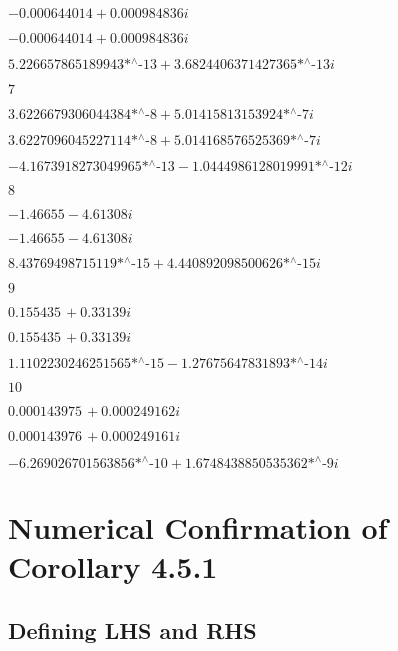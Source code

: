 \noindent\(-0.000644014+0.000984836 i\)

\noindent\(-0.000644014+0.000984836 i\)

\noindent\(\text{5.226657865189943$\grave{ }$*${}^{\wedge}$-13}+\text{3.6824406371427365$\grave{ }$*${}^{\wedge}$-13} i\)

\noindent\(7\)

\noindent\(\text{3.6226679306044384$\grave{ }$*${}^{\wedge}$-8}+\text{5.01415813153924$\grave{ }$*${}^{\wedge}$-7} i\)

\noindent\(\text{3.6227096045227114$\grave{ }$*${}^{\wedge}$-8}+\text{5.014168576525369$\grave{ }$*${}^{\wedge}$-7} i\)

\noindent\(-\text{4.1673918273049965$\grave{ }$*${}^{\wedge}$-13}-\text{1.0444986128019991$\grave{ }$*${}^{\wedge}$-12} i\)

\noindent\(8\)

\noindent\(-1.46655-4.61308 i\)

\noindent\(-1.46655-4.61308 i\)

\noindent\(\text{8.43769498715119$\grave{ }$*${}^{\wedge}$-15}+\text{4.440892098500626$\grave{ }$*${}^{\wedge}$-15} i\)

\noindent\(9\)

\noindent\(0.155435\, +0.33139 i\)

\noindent\(0.155435\, +0.33139 i\)

\noindent\(\text{1.1102230246251565$\grave{ }$*${}^{\wedge}$-15}-\text{1.27675647831893$\grave{ }$*${}^{\wedge}$-14} i\)

\noindent\(10\)

\noindent\(0.000143975\, +0.000249162 i\)

\noindent\(0.000143976\, +0.000249161 i\)

\noindent\(-\text{6.269026701563856$\grave{ }$*${}^{\wedge}$-10}+\text{1.6748438850535362$\grave{ }$*${}^{\wedge}$-9} i\)

\section*{Numerical Confirmation of Corollary 4.5.1}

\subsection*{Defining LHS and RHS}

